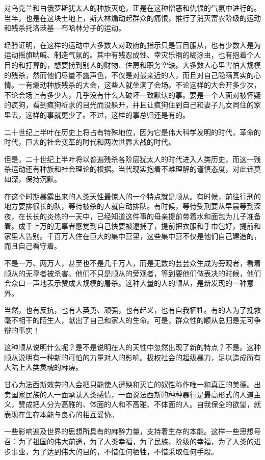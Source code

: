 对乌克兰和白俄罗斯犹太人的种族灭绝，正是在这种憎恶和仇恨的气氛中进行的。当年，也是在这块土地上，斯大林煽动起群众的痛恨，推行了消灭富农阶级的运动和残杀托洛茨基—布哈林分子的运动。

经验证明，在这样的运动中大多数人对政府的指示只是盲目服从，也有少数人是为运动摇旗呐喊、制造气氛的。其中有残忍成性、幸灾乐祸的糊涂虫，也有抱着个人目的和打算的，想要捞到别人的财物、住房和职务空缺。大多数人心里害怕大规模的残杀，然而他们尽量不露声色，不仅是对最亲近的人，而且对自己隐瞒真实的心情。一有煽动种族残杀的大会，这些人就坐满了会场。不论这样的大会开多少次，不论会场上有多少人，几乎没有什么人破坏一致默认的事。要是一个人面对被怀疑的疯狗，看到疯狗祈求的目光而没躲开，并且让疯狗住到自己和妻子儿女同住的家里去，这样的事就更少了。不过，这样的事总归还是有的。

二十世纪上半叶在历史上将占有特殊地位，因为它是伟大科学发明的时代，革命的时代，巨大的社会变革的时代和两次世界大战的时代。

但是，二十世纪上半叶将以普遍残杀各阶层犹太人的时代进入人类历史，而这一残杀运动还有种族和社会理论的根据。当代现实抱着不难理解的谨慎态度，对此讳莫如深，保持沉默。

在这个时期暴露出来的人类天性最惊人的一个特点就是顺从。有时候，前往行刑的地方要排很长的队，等待被杀的人就自动排队。有时候，等待受刑要从早晨等到深夜，在长长的炎热的一天中，已经知道这件事的母亲提前带着水和面包为儿子准备着。成千上万的无辜者感觉到自己快要被逮捕了，提前把衣服和手巾包好，提前和家里人告别。千百万人住在巨大的集中营里，这些集中营不仅是他们自己建造的，而且自己看守着。

不是一万、两万人，甚至也不是几千万人，而是无数的芸芸众生成为旁观者，看着顺从的无辜者被杀害。他们不只是顺从的旁观者，等到要他们做表决的时候，他们会众口一声地表示赞成大规模的屠杀。这种大量的人的顺从，是新发现的一种意外。

当然，也有反抗，也有人英勇、顽强，也有起义，也有自我牺牲。有的人为了挽救毫不相干的陌生人，献出了自己和家人的生命。可是，群众性的顺从总归是无可争辩的事实！

这种顺从说明什么呢？是不是说明在人的天性中忽然出现了新的特点？不是。这种顺从说明有一种新的可怕的力量对人的影响。极权社会的超级暴力，足以造成所有大陆上人类灵魂的麻痹。

甘心为法西斯效劳的人会把只能使人遭殃和灭亡的奴性称作唯一和真正的美德。出卖国家民族的人一面承认人类感情，一面说法西斯的种种暴行是最高形式的人道主义，赞成把人分为高雅的、体面的人和不高雅、不体面的人。自我保全的欲望，就表现在生存本能与良心的相互妥协。

一些影响遍及世界的思想所具有的麻醉力量，支持着生存的本能。这样一些思想号召：为了祖国的伟大前途，为了人类幸福，为了民族、阶级的幸福，为了人类的进步事业，为了达到伟大的目的，不惜任何牺牲，不惜采取任何手段。

